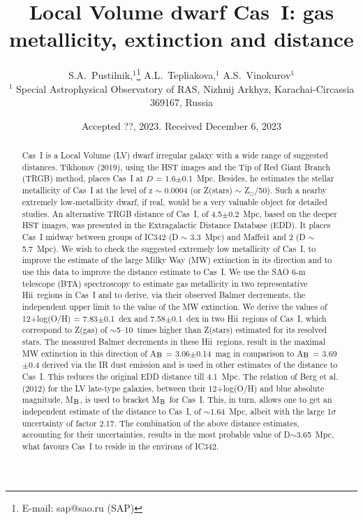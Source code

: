 \documentclass[useAMS,usenatbib]{mn2e}
\title[LV dwarf Cas~I: gas metallicity, extinction and distance]
{Local Volume dwarf Cas~I: gas metallicity, extinction and distance}
\author[S.A.~Pustilnik, A.L.~Tepliakova, A.S.~Vinokurov]
{S.A.~Pustilnik,$^{1}$\thanks{E-mail: sap@sao.ru (SAP)}
A.L.~Tepliakova,$^{1}$ A.S.~Vinokurov$^{1}$ \\
$^1$ Special Astrophysical Observatory of RAS, Nizhnij Arkhyz,
Karachai-Circassia 369167, Russia\\
}
\newcommand{\HII}{H{\sc ii}}
\newcommand{\sunn}{$_{\odot}$}
\begin{document}
\label{firstpage}

\date{Accepted ??, 2023. Received December 6, 2023}

\pagerange{\pageref{firstpage}--\pageref{lastpage}} 

\maketitle


\begin{abstract} 
Cas~I is a Local Volume (LV) dwarf irregular galaxy with a wide range of suggested distances.
Tikhonov (2019), using the HST images and the Tip of Red Giant Branch (TRGB) method,
places Cas~I at $D$ = 1.6$\pm$0.1~Mpc. Besides, he estimates the stellar metallicity of Cas~I
at the level of z $\sim$ 0.0004 (or Z(stars) $\sim$ Z\sunn/50).
Such a nearby extremely low-metallicity dwarf, if real, would be a very valuable object for detailed studies.
An alternative TRGB distance of Cas~I, of 4.5$\pm$0.2~Mpc, based on the deeper HST images,
was presented in the Extragalactic Distance Database (EDD). It places Cas~I midway between
groups of IC342 (D $\sim$ 3.3~Mpc) and Maffei1 and 2 (D $\sim$ 5.7~Mpc).      %
We wish to check the suggested extremely low metallicity of Cas~I, to improve the estimate of the large
Milky Way (MW) extinction in its direction and to use this data to improve the distance estimate to Cas~I.  %
We use the SAO 6-m telescope (BTA) spectroscopy to estimate gas metallicity in two representative
\HII\ regions in Cas~I and to derive, via their observed Balmer decrements, the independent upper limit to
the value of the MW extinction.  %
We derive the values of 12+log(O/H) = 7.83$\pm$0.1~dex and 7.58$\pm$0.1~dex in two \HII\ regions of Cas~I, which
correspond to Z(gas) of $\sim$5--10~times higher than Z(stars) estimated for its resolved stars. The measured
Balmer decrements in these \HII\ regions, result in the maximal MW extinction in this direction of
A$_{\rm B}$ = 3.06$\pm$0.14~mag in comparison to A$_{\rm B}$ = 3.69$\pm$0.4 derived via the IR dust
emission and is used in other estimates of the distance to Cas~I. This reduces the original EDD distance till 4.1~Mpc.
The relation of Berg et al. (2012) for the LV late-type galaxies, between their 12+log(O/H) and blue absolute magnitude,
M$_{\rm B}$, is used to bracket M$_{\rm B}$ for Cas~I. This, in turn, allows one to get an independent estimate of
the distance to Cas~I, of $\sim$1.64~Mpc, albeit with the large 1$\sigma$ uncertainty of factor 2.17.    %
The combination of the above distance estimates, accounting for their uncertainties, results in the most probable
value of D$\sim$3.65~Mpc, what favours  Cas~I to reside in the environs of IC342.   %
\end{abstract}
\end{document}
